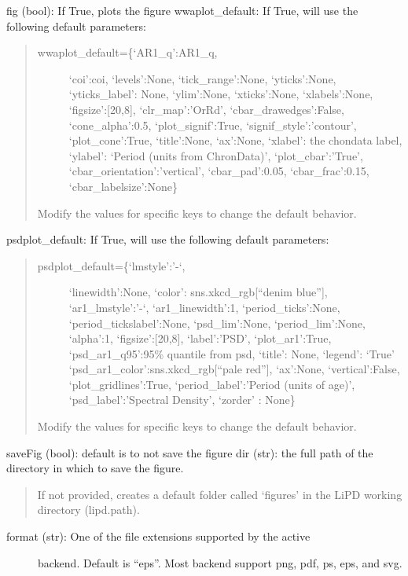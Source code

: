 \documentclass[letterpaper,10pt,english]{sphinxmanual}
\begin{document}
\begin{fulllineitems}
\begin{description}
fig (bool): If True, plots the figure    
wwaplot\_default: If True, will use the following default parameters:
\begin{quote}
\begin{description}
\item[{wwaplot\_default=\{‘AR1\_q’:AR1\_q,}] \leavevmode
‘coi’:coi,
‘levels’:None,
‘tick\_range’:None,
‘yticks’:None,
‘yticks\_label’: None,
‘ylim’:None,
‘xticks’:None,
‘xlabels’:None,
‘figsize’:{[}20,8{]},
‘clr\_map’:’OrRd’,
‘cbar\_drawedges’:False,
‘cone\_alpha’:0.5,
‘plot\_signif’:True,
‘signif\_style’:’contour’,
‘plot\_cone’:True,
‘title’:None,
‘ax’:None,
‘xlabel’: the chondata label,
‘ylabel’: ‘Period (units from ChronData)’,
‘plot\_cbar’:’True’,
‘cbar\_orientation’:’vertical’,
‘cbar\_pad’:0.05,
‘cbar\_frac’:0.15,
‘cbar\_labelsize’:None\}

\end{description}

Modify the values for specific keys to change the default behavior.
\end{quote}

psdplot\_default: If True, will use the following default parameters:
\begin{quote}
\begin{description}
\item[{psdplot\_default=\{‘lmstyle’:’-‘,}] \leavevmode
‘linewidth’:None,
‘color’: sns.xkcd\_rgb{[}“denim blue”{]},
‘ar1\_lmstyle’:’-‘,
‘ar1\_linewidth’:1,
‘period\_ticks’:None,
‘period\_tickslabel’:None,
‘psd\_lim’:None,
‘period\_lim’:None,
‘alpha’:1,
‘figsize’:{[}20,8{]},
‘label’:’PSD’,
‘plot\_ar1’:True,
‘psd\_ar1\_q95’:95\% quantile from psd,
‘title’: None,
‘legend’: ‘True’
‘psd\_ar1\_color’:sns.xkcd\_rgb{[}“pale red”{]},
‘ax’:None,
‘vertical’:False,
‘plot\_gridlines’:True,
‘period\_label’:’Period (units of age)’,
‘psd\_label’:’Spectral Density’,
‘zorder’ : None\}

\end{description}

Modify the values for specific keys to change the default behavior.
\end{quote}

saveFig (bool): default is to not save the figure
dir (str): the full path of the directory in which to save the figure.
\begin{quote}

If not provided, creates a default folder called ‘figures’ in the
LiPD working directory (lipd.path).
\end{quote}
\begin{description}
\item[{format (str): One of the file extensions supported by the active}] \leavevmode
backend. Default is “eps”. Most backend support png, pdf, ps, eps,
and svg.


\end{description}
\end{description}
\end{fulllineitems}
\end{document}
